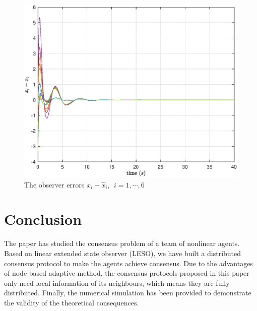 \documentclass[english]{cccconf}
\begin{document}
\begin{figure}[!htb]
  \centering
  \includegraphics[width=\hsize]{figures/estimation_errors.eps}
  \caption{The observer errors $x_i-\hat x_i,~~i=1,\cdots, 6$}
  \label{epic}
\end{figure}

\section{Conclusion}

The paper has studied the consensus problem of a team of nonlinear agents. Based on linear extended state observer (LESO), we have built a distributed consensus protocol to make the agents achieve consensus. Due to the advantages of node-based adaptive method, the consensus protocols proposed in this paper only need local information of its neighbours, which means they are fully distributed. Finally, the numerical simulation has been provided to demonstrate the validity of the theoretical consequences.




\end{document}
